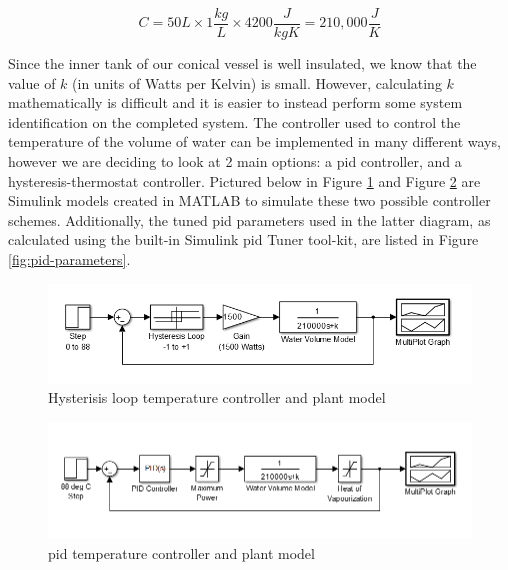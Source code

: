 \documentclass{article}
\begin{document}
\begin{equation}
C = 50L \times 1\frac{kg}{L} \times 4200\frac{J}{kgK} = 210,000\frac{J}{K}
\label{eq:value-heat}
\end{equation}

\noindent Since the inner tank of our conical vessel is well insulated, we know that the value of $k$ (in units of Watts per Kelvin) is small. However, calculating $k$ mathematically is difficult and it is easier to instead perform some system identification on the completed system.
The controller used to control the temperature of the volume of water can be implemented in many different ways, however we are deciding to look at 2 main options: a \gls{pid} controller, and a hysteresis-thermostat controller. Pictured below in Figure \ref{fig:hysteresis-block-diagram} and Figure \ref{fig:pid-block-diagram} are Simulink models created in MATLAB to simulate these two possible controller schemes. Additionally, the tuned \gls{pid} parameters used in the latter diagram, as calculated using the built-in Simulink \gls{pid} Tuner tool-kit, are listed in Figure \ref{fig:pid-parameters}.

\begin{figure}[H]
\begin{center}
\includegraphics[scale=0.70]{hysteresis-block-diagram.png}
\caption{Hysterisis loop temperature controller and plant model}
\label{fig:hysteresis-block-diagram}
\end{center}
\end{figure}

\begin{figure}[H]
\begin{center}
\includegraphics[scale=0.70]{pid-block-diagram.png}
\caption{\gls{pid} temperature controller and plant model}
\label{fig:pid-block-diagram}
\end{center}
\end{figure}
\end{document}
